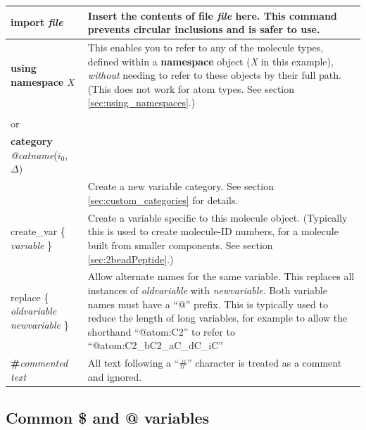 \documentclass[11pt]{article}
\begin{document}
\begin{longtable}[h]{l|p{9cm}}
\\
\hline
\textbf{import} \textit{file}
&
Insert the contents of file \textit{file} here.
This command prevents circular inclusions and is safer to use.
\\
\hline
\textbf{using namespace} \textit{X}
&
This enables you to refer to any of the molecule types,
defined within a \textbf{namespace} object (\textit{X} in this example),
\textit{without} needing to refer to these objects by their full path.
(This does not work for atom types.
See section \ref{sec:using_namespaces}.)
\\
\hline
\begin{tabular}[t]{l}
\textbf{category} \textit{\$catname}($i_0$, $\Delta$)
\\
or \\
\textbf{category} \textit{@catname}($i_0$, $\Delta$)
\\
\end{tabular}
&
Create a new variable category.
See section \ref{sec:custom_categories} for details.
\\
\hline
create\_var \{ \textit{variable} \} &
Create a variable specific to this molecule object. 
(Typically this is used to create molecule-ID numbers, 
for a molecule built from smaller components.
See section \ref{sec:2beadPeptide}.)
\\
\hline
replace \{ \textit{oldvariable} \textit{newvariable} \} &
Allow alternate names for the same variable.  This replaces all instances of \textit{oldvariable} with \textit{newvariable}.  Both variable names must have a ``@'' prefix.  This is typically used to reduce the length of long variables, for example to allow the shorthand ``@atom:C2'' to refer to ``@atom:C2\_bC2\_aC\_dC\_iC''
\\
\hline
 \textbf{\#}\textit{commented text} & 
All text following a ``\#'' character is treated as a comment and ignored.
\end{longtable}





\subsection{Common \$ and @ variables}
\end{document}
